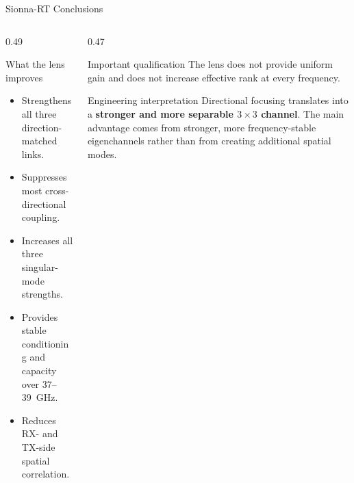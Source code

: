 \begin{frame}[t,shrink=8]{Sionna-RT Conclusions}
    \begin{columns}[T,onlytextwidth]
        \begin{column}{0.49\textwidth}
            \begin{exampleblock}{What the lens improves}
                \begin{itemize}
                    \item Strengthens all three direction-matched links.
                    \item Suppresses most cross-directional coupling.
                    \item Increases all three singular-mode strengths.
                    \item Provides stable conditioning and capacity over
                    37--39~GHz.
                    \item Reduces RX- and TX-side spatial correlation.
                \end{itemize}
            \end{exampleblock}
        \end{column}
        \begin{column}{0.47\textwidth}
            \begin{alertblock}{Important qualification}
                The lens does not provide uniform gain and does not increase
                effective rank at every frequency.
            \end{alertblock}

            \begin{block}{Engineering interpretation}
                Directional focusing translates into a
                \textbf{stronger and more separable $3\times3$ channel}.
                The main advantage comes from stronger, more frequency-stable
                eigenchannels rather than from creating additional spatial
                modes.
            \end{block}
        \end{column}
    \end{columns}
\end{frame}
